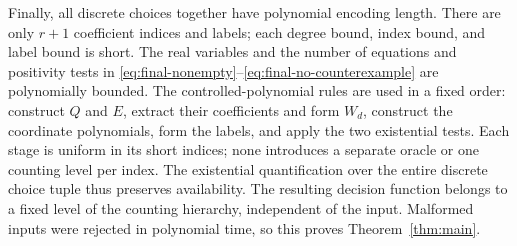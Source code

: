 Finally, all discrete choices together have polynomial encoding length.
There are only $r+1$ coefficient indices and labels; each degree bound,
index bound, and label bound is short.  The real variables and the
number of equations and positivity tests in
\eqref{eq:final-nonempty}--\eqref{eq:final-no-counterexample} are
polynomially bounded.  The controlled-polynomial rules are used in a
fixed order: construct $Q$ and $E$, extract their coefficients and form
$W_d$, construct the coordinate polynomials, form the labels, and apply
the two existential tests.  Each stage is uniform in its short indices;
none introduces a separate oracle or one counting level per index.
The existential quantification over the entire discrete choice tuple
thus preserves availability.  The resulting decision function belongs
to a fixed level of the counting hierarchy, independent of the input.
Malformed inputs were rejected in polynomial time, so this proves
Theorem~\ref{thm:main}.
